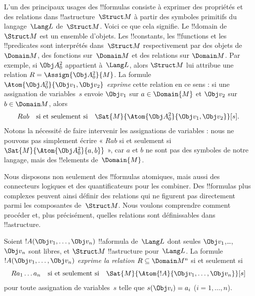 \documentclass[../../../include/open-logic-section]{subfiles}
\begin{document}


\begin{explain}
L'un des principaux usages des !!{formula}s consiste à exprimer des
propriétés et des relations dans !!a{structure}~$\Struct M$ à partir
des symboles primitifs du langage~$\Lang L$ de~$\Struct M$. Voici ce que cela
signifie. Le !!{domain} de~$\Struct M$ est un ensemble d'objets.
Les !!{constant}s, les !!{function}s et les !!{predicate}s sont
interprétés dans~$\Struct M$ respectivement par des objets de
$\Domain M$, des fonctions sur~$\Domain M$ et des relations sur
$\Domain M$. Par exemple, si $\Obj A^2_0$ appartient à~$\Lang L$,
alors $\Struct M$ lui attribue une relation
$R = \Assign{{\Obj A^2_0}}{M}$. La formule
$\Atom{\Obj A^2_0}{\Obj v_1, \Obj v_2}$ \emph{exprime} cette
relation en ce sens : si une assignation de variables~$s$ envoie
$\Obj v_1$ sur $a \in \Domain{M}$ et $\Obj v_2$ sur
$b \in \Domain M$, alors
\[
Rab \text{\quad si et seulement si\quad} \Sat{M}{\Atom{\Obj A^2_0}{\Obj v_1, \Obj v_2}}[s].
\]
Notons la nécessité de faire intervenir les assignations de
variables : nous ne pouvons pas simplement écrire
« $Rab$ si et seulement si $\Sat{M}{\Atom{\Obj A^2_0}{a, b}}$ »,
car $a$ et $b$ ne sont pas des symboles de notre langage, mais des
!!{element}s de~$\Domain{M}$.

Nous disposons non seulement des !!{formula}s atomiques, mais aussi
des connecteurs logiques et des quantificateurs pour les combiner.
Des !!{formula}s plus complexes peuvent ainsi définir des relations
qui ne figurent pas directement parmi les composantes de~$\Struct M$.
Nous voulons comprendre comment procéder et, plus précisément,
quelles relations sont définissables dans !!a{structure}.
\end{explain}

\begin{defn}
Soient $!A(\Obj v_1,\dots, \Obj v_n)$ !!a{formula} de~$\Lang L$
dont seules $\Obj v_1$,\dots, $\Obj v_n$ sont libres, et
$\Struct M$ !!a{structure} pour~$\Lang L$. La formule
$!A(\Obj v_1,\dots, \Obj v_n)$ \emph{exprime la relation}
$R \subseteq \Domain M^n$ si et seulement si
\[
Ra_1\dots a_n \text{\quad si et seulement si\quad} \Sat{M}{\Atom{!A}{\Obj
    v_1,\dots, \Obj v_n}}[s]
\]
pour toute assignation de variables~$s$ telle que
$s(\Obj v_i) = a_i$ ($i = 1, \dots, n$).
\end{defn}
\end{document}
